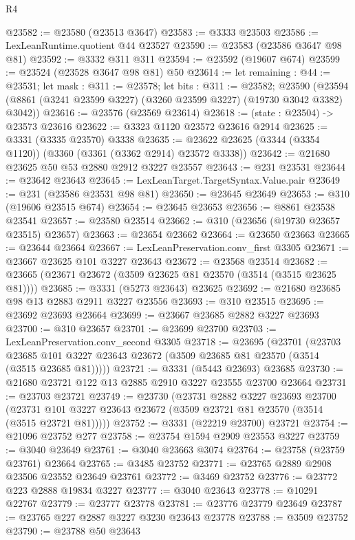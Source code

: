 \begin{lexlean}{R4}
\begin{coremodule}
@23582 := @23580 (@23513 @3647)
@23583 := @3333 @23503
@23586 := LexLeanRuntime.quotient @44 @23527
@23590 := @23583 (@23586 @3647 @98 @81)
@23592 := @3332 @311 @311
@23594 := @23592 (@19607 @674)
@23599 := @23524 (@23528 @3647 @98 @81) @50
@23614 := let remaining : @44 := @23531;
  let mask : @311 := @23578;
  let bits : @311 := @23582;
  @23590 (@23594 (@8861 (@3241 @23599 @3227) (@3260 @23599 @3227) (@19730 @3042 @3382) @3042))
@23616 := @23576 (@23569 @23614)
@23618 := (state : @23504) -> @23573 @23616
@23622 := @3323 @1120 @23572 @23616 @2914
@23625 := @3331 (@3335 @23570) @3338
@23635 := @23622 @23625 (@3344 (@3354 @1120)) (@3360 (@3361 (@3362 @2914) @23572 @3338))
@23642 := @21680 @23625 @50 @53 @2880 @2912 @3227 @23557
@23643 := @231 @23531
@23644 := @23642 @23643
@23645 := LexLeanTarget.TargetSyntax.Value.pair
@23649 := @231 (@23586 @23531 @98 @81)
@23650 := @23645 @23649
@23653 := @310 (@19606 @23515 @674)
@23654 := @23645 @23653
@23656 := @8861 @23538 @23541
@23657 := @23580 @23514
@23662 := @310 (@23656 (@19730 @23657 @23515) @23657)
@23663 := @23654 @23662
@23664 := @23650 @23663
@23665 := @23644 @23664
@23667 := LexLeanPreservation.conv_first @3305
@23671 := @23667 @23625 @101 @3227 @23643
@23672 := @23568 @23514
@23682 := @23665 (@23671 @23672 (@3509 @23625 @81 @23570 (@3514 (@3515 @23625 @81))))
@23685 := @3331 (@5273 @23643) @23625
@23692 := @21680 @23685 @98 @13 @2883 @2911 @3227 @23556
@23693 := @310 @23515
@23695 := @23692 @23693 @23664
@23699 := @23667 @23685 @2882 @3227 @23693
@23700 := @310 @23657
@23701 := @23699 @23700
@23703 := LexLeanPreservation.conv_second @3305
@23718 := @23695
    (@23701
      (@23703 @23685 @101 @3227 @23643 @23672 (@3509 @23685 @81 @23570 (@3514 (@3515 @23685 @81)))))
@23721 := @3331 (@5443 @23693) @23685
@23730 := @21680 @23721 @122 @13 @2885 @2910 @3227 @23555 @23700 @23664
@23731 := @23703 @23721
@23749 := @23730
    (@23731
      @2882
      @3227
      @23693
      @23700
      (@23731 @101 @3227 @23643 @23672 (@3509 @23721 @81 @23570 (@3514 (@3515 @23721 @81)))))
@23752 := @3331 (@22219 @23700) @23721
@23754 := @21096 @23752 @277
@23758 := @23754 @1594 @2909 @23553 @3227
@23759 := @3040 @23649
@23761 := @3040 @23663 @3074
@23764 := @23758 (@23759 @23761) @23664
@23765 := @3485 @23752
@23771 := @23765 @2889 @2908 @23506 @23552 @23649 @23761
@23772 := @3469 @23752
@23776 := @23772 @223 @2888 @19834 @3227
@23777 := @3040 @23643
@23778 := @10291 @22767
@23779 := @23777 @23778
@23781 := @23776 @23779 @23649
@23787 := @23765 @227 @2887 @3227 @3230 @23643 @23778
@23788 := @3509 @23752
@23790 := @23788 @50 @23643

\end{coremodule}
\end{lexlean}
